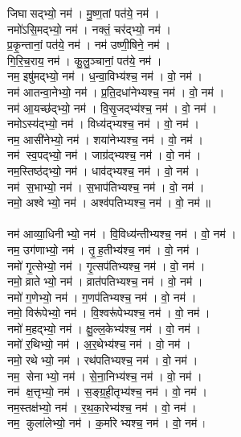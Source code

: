 जिघासद्भ्यो॒ नम॑। मु॒ष्ण॒तां पत॑ये॒ नम॑। \\
नमो॑ऽसि॒मद्भ्यो॒ नम॑। नक्तं॒ चर॑द्भ्यो॒ नम॑। \\
प्र॒कृ॒न्तानां॒ पत॑ये॒ नम॑। नम॑ उष्णी॒षिने॒ नम॑। \\
गि॒रि॒च॒राय॒ नम॑। कु॒लु॒ञ्चानां॒ पत॑ये॒  नम॑। \\
नम॒ इषु॑मद्भ्यो॒  नम॑। ध॒न्वा॒विभ्य॑श्च॒  नम॑। वो॒  नम॑। \\
नम॑ आतन्वा॒नेभ्यो॒ नम॑। प्र॒ति॒दधा॑नेभ्यश्च॒  नम॑। वो॒ नम॑।\\
नम॑ आ॒यच्छ॑द्भ्यो॒  नम॑।  वि॒सृ॒जद्भ्य॑श्च॒  नम॑।  वो॒ नम॑।\\
नमोऽस्य॑द्भ्यो॒  नम॑। विध्य॑द्भ्यश्च॒  नम॑।  वो॒ नम॑।\\
नम॒ आसी॑नेभ्यो॒  नम॑। शया॑नेभ्यश्च॒  नम॑। वो॒ नम॑।\\
नम॑ स्व॒पद्भ्यो॒  नम॑। जाग्र॑द्भ्यश्च॒  नम॑।  वो॒ नम॑।\\
नम॒स्तिष्ठ॑द्भ्यो॒  नम॑। धाव॑द्भ्यश्च॒  नम॑।  वो॒ नम॑।\\
नम॑ स॒भाभ्यो॒  नम॑। स॒भाप॑तिभ्यश्च॒ नम॑। वो॒ नम॑।\\
नमो॒ अश्वेभ्यो॒  नम॑। अश्व॑पतिभ्यश्च॒  नम॑। वो॒ नम॑॥\\
\\
नम॑ आव्या॒धिनीभ्यो॒  नम॑। वि॒विध्य॑न्तीभ्यश्च॒  नम॑।  वो॒ नम॑। \\
नम॒ उग॑णाभ्यो॒ नम॑। तृ॒ह॒तीभ्य॑श्च॒ नम॑। वो॒ नम॑। \\
नमो॑ गृ॒त्सेभ्यो॒ नम॑। गृ॒त्सप॑तिभ्यश्च॒ नम॑। वो॒ नम॑। \\
नमो॒ व्रातेभ्यो॒ नम॑। व्रात॑पतिभ्यश्च॒ नम॑। वो॒ नम॑। \\
नमो॑ ग॒णेभ्यो॒ नम॑। ग॒णप॑तिभ्यश्च॒ नम॑। वो॒ नम॑।\\
नमो॒ विरू॑पेभ्यो॒ नम॑। वि॒श्वरू॑पेभ्यश्च॒ नम॑। वो॒ नम॑। \\
नमो॑ म॒हद्भ्यो॒ नम॑। क्षु॒ल्ल॒केभ्य॑श्च॒ नम॑। वो॒ नम॑।\\
नमो॑ र॒थिभ्यो॒ नम॑। अ॒र॒थेभ्य॑श्च॒ नम॑। वो॒ नम॑। \\
नमो॒ रथेभ्यो॒ नम॑। रथ॑पतिभ्यश्च॒ नम॑। वो॒ नम॑।\\
नम॒ सेनाभ्यो॒ नम॑। से॒ना॒निभ्य॑श्च॒ नम॑। वो॒ नम॑। \\
नम॑ क्ष॒त्तृभ्यो॒ नम॑। स॒ङ्ग्र॒ही॒तृभ्य॑श्च॒ नम॑। वो॒ नम॑। \\
नम॒स्तक्ष॑भ्यो॒ नम॑। र॒थ॒का॒रेभ्य॑श्च॒ नम॑। वो॒ नम॑। \\
नम॒ कुला॑लेभ्यो॒ नम॑। क॒र्मारेभ्यश्च॒ नम॑। वो॒ नम॑। \\
